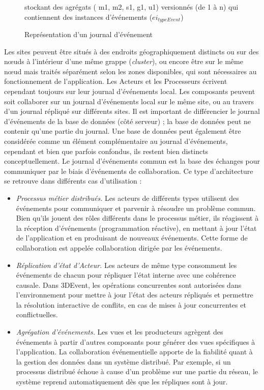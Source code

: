 \begin{figure}
	\centering
	\caption{Représentation d'un journal d'événement}{stockant des agrégats (\og 
	m1\fg{}, \og m2\fg{}, \og s1\fg{}, \og g1\fg{}, \og u1\fg{}) versionnés (de 1 à n) 
	qui contiennent des instances d'événements ($ei_{typeEvent}$)} 
	\label{fig:event-store}
\end{figure}

Les sites peuvent être situés à des endroits géographiquement distincts ou sur 
des nœuds à l'intérieur d'une même grappe (\textit{cluster}), ou encore être sur le 
même nœud mais traités séparément selon les zones 
disponibles, qui sont nécessaires au fonctionnement de l'application. 
Les Acteurs et les Processeurs écrivent cependant toujours sur leur journal 
d'événements local. 
Les composants peuvent soit collaborer sur un journal d'événements local sur le 
même site, ou au travers d'un journal répliqué sur différents sites.
Il est important de différencier le journal d'événements de la base de données 
(côté serveur) ; la base de données peut ne contenir qu'une partie du journal. 
Une base de données peut également être considérée comme un élément 
complémentaire au journal d'événements, cependant et bien que parfois 
confondus, ils restent bien distincts conceptuellement.
Le journal d'événements commun est la base des échanges pour communiquer 
par le biais d'événements de collaboration. Ce type d'architecture se retrouve dans 
différents cas d'utilisation :
\begin{itemize}
	\item \textit{Processus métier distribués.} Les acteurs de différents types 
	utilisent des événements pour communiquer et parvenir à résoudre un problème 
	commun. Bien qu'ils jouent des rôles différents dans le processus métier, ils 
	réagissent à la réception d'événements (programmation réactive), en 
	mettant à jour l'état de l'application et en produisant de nouveaux événements. 
	Cette forme de collaboration est appelée collaboration dirigée par les 
	événements.
	\item\textit{Réplication d'état d'Acteur.} Les acteurs de même type consomment 
	les événements de chacun pour répliquer l'état interne avec une cohérence 
	causale. Dans 3DEvent, les opérations concurrentes sont autorisées dans 
	l'environnement pour mettre à jour l'état des acteurs répliqués et permettre la 
	résolution interactive de conflits, en cas de mises à jour concurrentes et 
	conflictuelles. 
	\item \textit{Agrégation d'événements.} Les vues et les producteurs agrègent des 
	événements à partir d'autres composants pour générer des vues spécifiques à 
	l'application.
	La collaboration événementielle apporte de la fiabilité quant à la gestion des 
	données dans un système distribué. Par exemple, si un processus distribué 
	échoue à cause d'un problème sur une partie du réseau, le système reprend 
	automatiquement dès que les répliques sont à jour.
\end{itemize}

